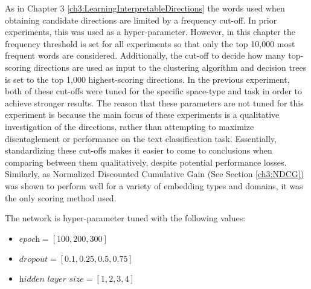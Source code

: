 As in Chapter 3 \ref{ch3:LearningInterpretableDirections} the words used when obtaining candidate directions are limited by a  frequency cut-off. In prior experiments, this was used as a  hyper-parameter. However, in this chapter the frequency threshold is set for all experiments so that only the   top 10,000 most frequent words are considered. Additionally, the cut-off to decide how many top-scoring directions are used as input to the clustering algorithm and decision trees is set to the top 1,000 highest-scoring directions. In the previous experiment, both of these cut-offs were tuned for the specific space-type and task in order to achieve stronger results. The reason that these parameters are not tuned for this experiment is because the main focus of these experiments is a qualitative investigation of the directions, rather than attempting to maximize disentaglement or  performance on the text classification task. Essentially, standardizing these cut-offs makes it easier to come to conclusions when comparing between them qualitatively, despite potential performance losses. Similarly, as Normalized Discounted Cumulative Gain (See Section \ref{ch3:NDCG}) was shown to perform well for a variety of embedding types and domains, it was the only scoring method used.




The network is hyper-parameter tuned with the following values: 

\begin{itemize}
	\item $\textit{epoch} = [100, 200, 300]$
	\item $\textit{dropout} = [0.1, 0.25, 0.5, 0.75]$
	\item $\textit{hidden layer size} =[1,  2, 3, 4]$
\end{itemize}

